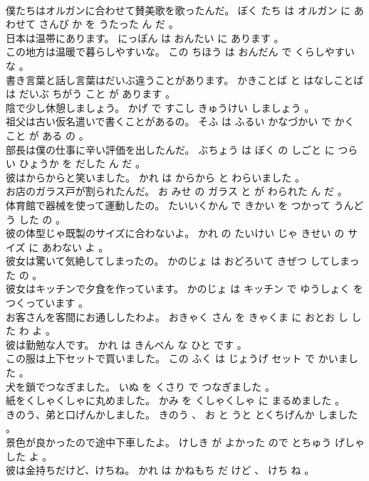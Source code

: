 \documentclass[8pt]{extreport}
\begin{document}
\begin{CJK}{UTF8}{min}
\\	僕たちはオルガンに合わせて賛美歌を歌ったんだ。	ぼく たち は オルガン に あわせて さんび か を うたった ん だ 。 
\\	日本は温帯にあります。	にっぽん は おんたい に あります 。 
\\	この地方は温暖で暮らしやすいな。	この ちほう は おんだん で くらしやすい な 。 
\\	書き言葉と話し言葉はだいぶ違うことがあります。	かきことば と はなしことば は だいぶ ちがう こと が あります 。 
\\	陰で少し休憩しましょう。	かげ で すこし きゅうけい しましょう 。 
\\	祖父は古い仮名遣いで書くことがあるの。	そふ は ふるい かなづかい で かく こと が ある の 。 
\\	部長は僕の仕事に辛い評価を出したんだ。	ぶちょう は ぼく の しごと に つらい ひょうか を だした ん だ 。 
\\	彼はからからと笑いました。	かれ は からから と わらいました 。 
\\	お店のガラス戸が割られたんだ。	お みせ の ガラス と が わられた ん だ 。 
\\	体育館で器械を使って運動したの。	たいいくかん で きかい を つかって うんどう した の 。 
\\	彼の体型じゃ既製のサイズに合わないよ。	かれ の たいけい じゃ きせい の サイズ に あわない よ 。 
\\	彼女は驚いて気絶してしまったの。	かのじょ は おどろいて きぜつ してしまった の 。 
\\	彼女はキッチンで夕食を作っています。	かのじょ は キッチン で ゆうしょく を つくっています 。 
\\	お客さんを客間にお通ししたわよ。	おきゃく さん を きゃくま に おとお し した わ よ 。 
\\	彼は勤勉な人です。	かれ は きんべん な ひと です 。 
\\	この服は上下セットで買いました。	この ふく は じょうげ セット で かいました 。 
\\	犬を鎖でつなぎました。	いぬ を くさり で つなぎました 。 
\\	紙をくしゃくしゃに丸めました。	かみ を くしゃくしゃ に まるめました 。 
\\	きのう、弟と口げんかしました。	きのう 、 お と うと とくちげんか しました 。 
\\	景色が良かったので途中下車したよ。	けしき が よかった ので とちゅう げしゃ した よ 。 
\\	彼は金持ちだけど、けちね。	かれ は かねもち だ けど 、 けち ね 。 

\end{CJK}
\end{document}
